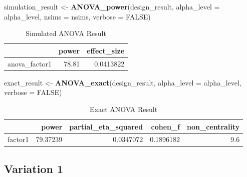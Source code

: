 \documentclass[]{book}
\newenvironment{Shaded}{\begin{snugshade}}{\end{snugshade}}
\newcommand{\DataTypeTok}[1]{\textcolor[rgb]{0.13,0.29,0.53}{#1}}
\newcommand{\KeywordTok}[1]{\textcolor[rgb]{0.13,0.29,0.53}{\textbf{#1}}}
\newcommand{\NormalTok}[1]{#1}
\newcommand{\OtherTok}[1]{\textcolor[rgb]{0.56,0.35,0.01}{#1}}
\newcommand{\StringTok}[1]{\textcolor[rgb]{0.31,0.60,0.02}{#1}}
\begin{document}
\begin{Shaded}
\begin{Highlighting}[]
\NormalTok{simulation_result <-}\StringTok{ }\KeywordTok{ANOVA_power}\NormalTok{(design_result, }
                                 \DataTypeTok{alpha_level =}\NormalTok{ alpha_level, }
                                 \DataTypeTok{nsims =}\NormalTok{ nsims,}
                                 \DataTypeTok{verbose =} \OtherTok{FALSE}\NormalTok{)}
\end{Highlighting}
\end{Shaded}

\begin{table}[!h]

\caption{\label{tab:unnamed-chunk-53}Simulated ANOVA Result}
\centering
\begin{tabular}{l|r|r}
\hline
  & power & effect\_size\\
\hline
anova\_factor1 & 78.81 & 0.0413822\\
\hline
\end{tabular}
\end{table}

\begin{Shaded}
\begin{Highlighting}[]
\NormalTok{exact_result <-}\StringTok{ }\KeywordTok{ANOVA_exact}\NormalTok{(design_result,}
                            \DataTypeTok{alpha_level =}\NormalTok{ alpha_level,}
                            \DataTypeTok{verbose =} \OtherTok{FALSE}\NormalTok{)}
\end{Highlighting}
\end{Shaded}

\begin{table}[!h]

\caption{\label{tab:unnamed-chunk-55}Exact ANOVA Result}
\centering
\begin{tabular}{l|r|r|r|r}
\hline
  & power & partial\_eta\_squared & cohen\_f & non\_centrality\\
\hline
factor1 & 79.37239 & 0.0347072 & 0.1896182 & 9.6\\
\hline
\end{tabular}
\end{table}

\hypertarget{variation-1}{%
\subsection{Variation 1}\label{variation-1}}
\end{document}
